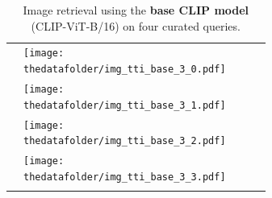 \documentclass[10pt]{article} %
\newcommand{\SM}[1]{\textcolor{blue}{[SM: #1]}}
\begin{document}
\begin{table}[h!]
\begin{tabular}{m{3cm} p{3cm} p{3cm} p{3cm} p{3cm}}
      \midrule
      \texttt{} \vspace{20mm} & \centering \texttt{[image: \\thedatafolder/img\_tti\_base\_3\_0.pdf]} \\  & \centering \texttt{[image: \\thedatafolder/img\_tti\_base\_3\_1.pdf]} \\  & \centering \texttt{[image: \\thedatafolder/img\_tti\_base\_3\_2.pdf]} \\  & \centering \texttt{[image: \\thedatafolder/img\_tti\_base\_3\_3.pdf]} \\   \tabularnewline
      \bottomrule
  \end{tabular}
  \caption{Image retrieval using the \textbf{\textcolor{deeppurple}{base CLIP model}} (CLIP-ViT-B/16) on four curated queries.}
  \label{tab:tti_base}
\end{table}


\end{document}
